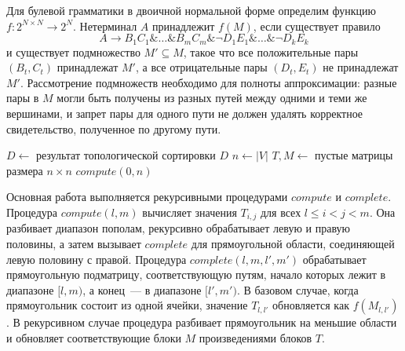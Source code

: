 Для булевой грамматики в двоичной нормальной форме определим функцию $f:2^{N \times N}\rightarrow 2^N$. Нетерминал $A$ принадлежит $f(M)$, если существует правило
\[
    A \rightarrow B_1 C_1 \& \ldots \& B_m C_m \& \neg D_1 E_1 \& \ldots \& \neg D_k E_k
\]
и существует подмножество $M' \subseteq M$, такое что все положительные пары $(B_t,C_t)$ принадлежат $M'$, а все отрицательные пары $(D_t,E_t)$ не принадлежат $M'$. Рассмотрение подмножеств необходимо для полноты аппроксимации: разные пары в $M$ могли быть получены из разных путей между одними и теми же вершинами, и запрет пары для одного пути не должен удалять корректное свидетельство, полученное по другому пути.

\begin{algorithm}[H]
    \footnotesize
    \caption{Матричный алгоритм для булевых грамматик на DAG}
    \label{lst:boolean_dag_matrix_reachability}
    $D \gets$ результат топологической сортировки $D$\;
    $n \gets |V|$\;
    $T,M \gets$ пустые матрицы размера $n \times n$\;
    $compute(0,n)$\;
    \;
\end{algorithm}

Основная работа выполняется рекурсивными процедурами $compute$ и $complete$. Процедура $compute(l,m)$ вычисляет значения $T_{i,j}$ для всех $l \leq i < j < m$. Она разбивает диапазон пополам, рекурсивно обрабатывает левую и правую половины, а затем вызывает $complete$ для прямоугольной области, соединяющей левую половину с правой. Процедура $complete(l,m,l',m')$ обрабатывает прямоугольную подматрицу, соответствующую путям, начало которых лежит в диапазоне $[l,m)$, а конец~--- в диапазоне $[l',m')$. В базовом случае, когда прямоугольник состоит из одной ячейки, значение $T_{l,l'}$ обновляется как $f(M_{l,l'})$. В рекурсивном случае процедура разбивает прямоугольник на меньшие области и обновляет соответствующие блоки $M$ произведениями блоков $T$.



